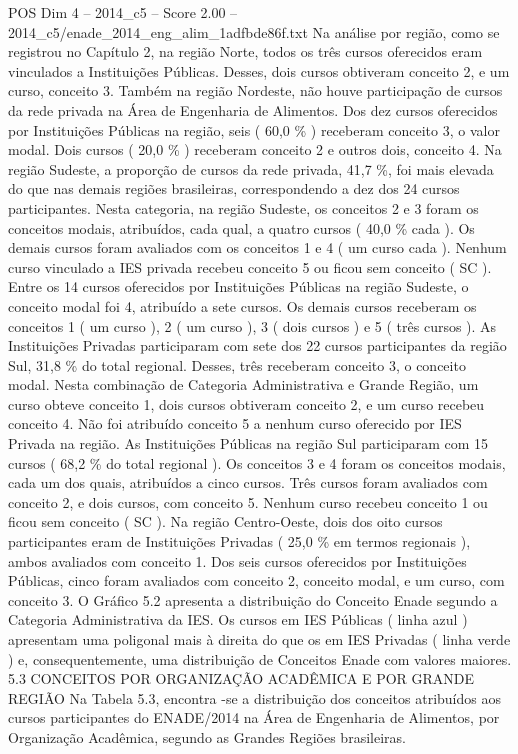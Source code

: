 \begin{textsample}{POS Dim 4 – 2014\_c5 – Score 2.00 – 2014\_c5/enade\_2014\_eng\_alim\_1adfbde86f.txt}
Na análise por região, como se registrou no Capítulo 2, na região Norte, todos os três cursos oferecidos eram vinculados a Instituições Públicas.
Desses, dois cursos obtiveram conceito 2, e um curso, conceito 3.
Também na região Nordeste, não houve participação de cursos da rede privada na Área de Engenharia de Alimentos.
Dos dez cursos oferecidos por Instituições Públicas na região, seis ( 60,0 \% ) receberam conceito 3, o valor modal.
Dois cursos ( 20,0 \% ) receberam conceito 2 e outros dois, conceito 4.
Na região Sudeste, a proporção de cursos da rede privada, 41,7 \%, foi mais elevada do que nas demais regiões brasileiras, correspondendo a dez dos 24 cursos participantes.
Nesta categoria, na região Sudeste, os conceitos 2 e 3 foram os conceitos modais, atribuídos, cada qual, a quatro cursos ( 40,0 \% cada ).
Os demais cursos foram avaliados com os conceitos 1 e 4 ( um curso cada ).
Nenhum curso vinculado a IES privada recebeu conceito 5 ou ficou sem conceito ( SC ).
Entre os 14 cursos oferecidos por Instituições Públicas na região Sudeste, o conceito modal foi 4, atribuído a sete cursos.
Os demais cursos receberam os conceitos 1 ( um curso ), 2 ( um curso ), 3 ( dois cursos ) e 5 ( três cursos ).
As Instituições Privadas participaram com sete dos 22 cursos participantes da região Sul, 31,8 \% do total regional.
Desses, três receberam conceito 3, o conceito modal.
Nesta combinação de Categoria Administrativa e Grande Região, um curso obteve conceito 1, dois cursos obtiveram conceito 2, e um curso recebeu conceito 4.
Não foi atribuído conceito 5 a nenhum curso oferecido por IES Privada na região.
As Instituições Públicas na região Sul participaram com 15 cursos ( 68,2 \% do total regional ).
Os conceitos 3 e 4 foram os conceitos modais, cada um dos quais, atribuídos a cinco cursos.
Três cursos foram avaliados com conceito 2, e dois cursos, com conceito 5.
Nenhum curso recebeu conceito 1 ou ficou sem conceito ( SC ).
Na região Centro-Oeste, dois dos oito cursos participantes eram de Instituições Privadas ( 25,0 \% em termos regionais ), ambos avaliados com conceito 1.
Dos seis cursos oferecidos por Instituições Públicas, cinco foram avaliados com conceito 2, conceito modal, e um curso, com conceito 3.
O Gráfico 5.2 apresenta a distribuição do Conceito Enade segundo a Categoria Administrativa da IES.
Os cursos em IES Públicas ( linha azul ) apresentam uma poligonal mais à direita do que os em IES Privadas ( linha verde ) e, consequentemente, uma distribuição de Conceitos Enade com valores maiores. 5.3 CONCEITOS POR ORGANIZAÇÃO ACADÊMICA E POR GRANDE REGIÃO Na Tabela 5.3, encontra -se a distribuição dos conceitos atribuídos aos cursos participantes do ENADE/2014 na Área de Engenharia de Alimentos, por Organização Acadêmica, segundo as Grandes Regiões brasileiras.

\end{textsample}
